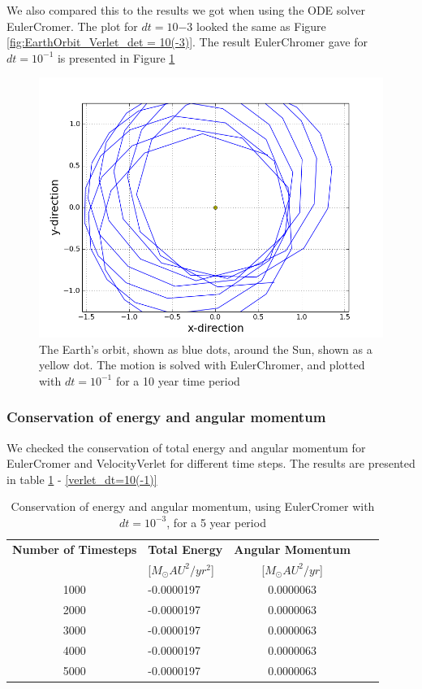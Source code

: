 \documentclass[norsk,a4paper,12pt]{article}
\begin{document}
{We also compared this to the results we got when using the ODE solver EulerCromer. The plot for $dt=10{-3}$ looked the same as Figure \ref{fig:EarthOrbit_Verlet_det = 10(-3)}. The result EulerChromer gave for $dt=10^{-1}$ is presented in Figure \ref{fig:oppg_3c_sun_earth_euler_dt=10(-1)}

\begin{figure} [H]
    \centering
    \includegraphics[scale=0.6]{oppg_3c_sun_earth_euler_dt=10(-1)}
    \caption{The Earth's orbit, shown as blue dots, around the Sun, shown as a yellow dot. The motion is solved with EulerChromer, and plotted with $dt = 10^{-1}$ for a 10 year time period}
    \label{fig:oppg_3c_sun_earth_euler_dt=10(-1)}
\end{figure}

\subsubsection{Conservation of energy and angular momentum}
We checked the conservation of total energy and angular momentum for EulerCromer and VelocityVerlet for different time steps. The results are presented in table \ref{euler_dt=10(-3)} - \ref{verlet_dt=10(-1)}
\par
\vspace{3mm}

\begin{table} [H]
\centering
\caption{Conservation of energy and angular momentum, using EulerCromer with $dt=10^{-3}$, for a 5 year period}
\begin{tabularx}{\textwidth}{cXcXc} \toprule
    {\bf Number of Timesteps} & {\bf Total Energy }& {\bf Angular Momentum} \\
    &[$M_\odot AU^2/yr^2$]&[$M_\odot AU^2/yr$]\\ \hline
    1000 & -0.0000197 & 0.0000063\\ \hline
    2000 & -0.0000197 & 0.0000063\\ \hline
    3000 & -0.0000197 & 0.0000063\\ \hline
    4000 & -0.0000197 & 0.0000063\\ \hline
    5000 & -0.0000197 & 0.0000063\\ \bottomrule 
\end{tabularx}
\label{euler_dt=10(-3)}
\end{table}

}
\end{document}
